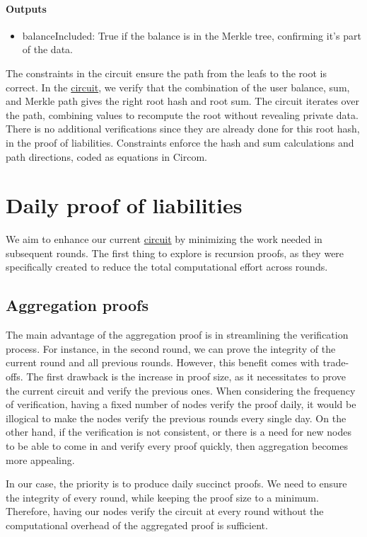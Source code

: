 \paragraph{Outputs}
\begin{itemize}
   \item balanceIncluded: True if the balance is in the Merkle tree, confirming it's part of the data.
   \end{itemize}



The constraints in the circuit ensure the path from the leafs to the root is correct. 
In the \hyperref[subsec:pic]{circuit}, we verify that the combination of the user balance, sum, and Merkle path gives the right root hash and root sum. 
The circuit iterates over the path, combining values to recompute the root without revealing private data. 
There is no additional verifications since they are already done for this root hash, in the proof of liabilities. 
Constraints enforce the hash and sum calculations and path directions, coded as equations in Circom.

\section{Daily proof of liabilities}
We aim to enhance our current \hyperref[subsec:pl]{circuit} by minimizing the work needed in subsequent rounds.
The first thing to explore is recursion proofs, as they were specifically created to reduce the total computational effort across rounds.

\subsection{Aggregation proofs}
The main advantage of the aggregation proof is in streamlining the verification process. For instance, in the second round, we can prove the integrity of the current round and all previous rounds.
However, this benefit comes with trade-offs. The first drawback is the increase in proof size, as it necessitates to prove the current circuit and verify the previous ones.
When considering the frequency of verification, having a fixed number of nodes verify the proof daily, it would be illogical to make the nodes verify the previous rounds every single day.
On the other hand, if the verification is not consistent, or there is a need for new nodes to be able to come in and verify every proof quickly, then aggregation becomes more appealing.

In our case, the priority is to produce daily succinct proofs. We need to ensure the integrity of every round, while keeping the proof size to a minimum.
Therefore, having our nodes verify the circuit at every round without the computational overhead of the aggregated proof is sufficient.

